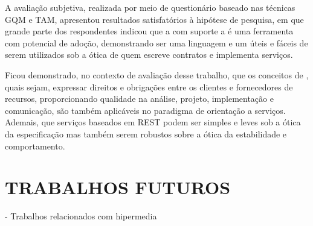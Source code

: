 A avaliação subjetiva, realizada por meio de questionário baseado nas técnicas GQM e TAM, apresentou
resultados satisfatórios à hipótese de pesquisa, em que grande parte dos respondentes indicou que a \neoidl{} com suporte
a \designbycontract{} é uma ferramenta com potencial de adoção, demonstrando ser uma linguagem e um 
\framework{} úteis e fáceis de serem utilizados sob a ótica de quem escreve contratos e implementa
serviços. 

Ficou demonstrado, no contexto de avaliação desse trabalho, que os conceitos de \designbycontract, quais sejam,
expressar direitos e obrigações entre os clientes e fornecedores de recursos, proporcionando qualidade na
análise, projeto, implementação e comunicação, são também aplicáveis no paradigma de orientação
a serviços. Ademais, que serviços baseados em \wss REST podem ser simples e leves sob a ótica
da especificação mas também serem robustos sobre a ótica da estabilidade e comportamento.


\section{TRABALHOS FUTUROS}
\vspace{-6mm}



- Trabalhos relacionados com hipermedia
